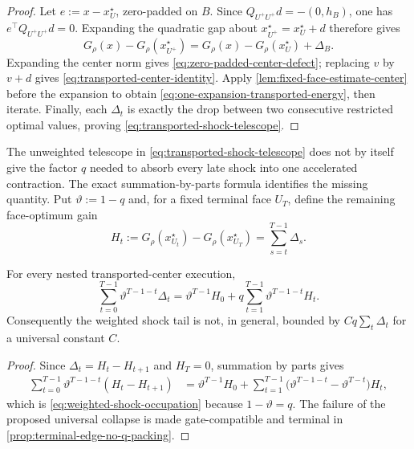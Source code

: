 \begin{proof}
Let $e:=x-x_U^\star$, zero-padded on $B$.  Since
$Q_{U^+U^+}d=-(0,h_B)$, one has $e^\top Q_{U^+U^+}d=0$.  Expanding the
quadratic gap about $x_{U^+}^\star=x_U^\star+d$ therefore gives
\begin{equation*}
 G_\rho(x)-G_\rho(x_{U^+}^\star)
 =G_\rho(x)-G_\rho(x_U^\star)+\Delta_B.
\end{equation*}
Expanding the center norm gives \cref{eq:zero-padded-center-defect}; replacing
$v$ by $v+d$ gives \cref{eq:transported-center-identity}.  Apply
\cref{lem:fixed-face-estimate-center} before the expansion to obtain
\cref{eq:one-expansion-transported-energy}, then iterate.  Finally, each
$\Delta_t$ is exactly the drop between two consecutive restricted optimal
values, proving \cref{eq:transported-shock-telescope}.
\end{proof}

The unweighted telescope in \cref{eq:transported-shock-telescope} does not
by itself give the factor $q$ needed to absorb every late shock into one
accelerated contraction.  The exact summation-by-parts formula identifies the
missing quantity.  Put $\vartheta:=1-q$ and, for a fixed terminal face
$U_T$, define the remaining face-optimum gain
\begin{equation}
 H_t:=G_\rho(x_{U_t}^\star)-G_\rho(x_{U_T}^\star)
     =\sum_{s=t}^{T-1}\Delta_s.
 \label{eq:remaining-face-gain}
\end{equation}

\begin{lemma}
\label{lem:weighted-shock-occupation}
For every nested transported-center execution,
\begin{equation}
 \sum_{t=0}^{T-1}\vartheta^{T-1-t}\Delta_t
 =\vartheta^{T-1}H_0
  +q\sum_{t=1}^{T-1}\vartheta^{T-1-t}H_t.
 \label{eq:weighted-shock-occupation}
\end{equation}
Consequently the weighted shock tail is not, in general, bounded by
$Cq\sum_t\Delta_t$ for a universal constant $C$.
\end{lemma}

\begin{proof}
Since $\Delta_t=H_t-H_{t+1}$ and $H_T=0$, summation by parts gives
\begin{align*}
 \sum_{t=0}^{T-1}\vartheta^{T-1-t}(H_t-H_{t+1})
 &=\vartheta^{T-1}H_0
   +\sum_{t=1}^{T-1}
     \bigl(\vartheta^{T-1-t}-\vartheta^{T-t}\bigr)H_t,
\end{align*}
which is \cref{eq:weighted-shock-occupation} because
$1-\vartheta=q$.  The failure of the proposed universal collapse is made
gate-compatible and terminal in \cref{prop:terminal-edge-no-q-packing}.
\end{proof}

